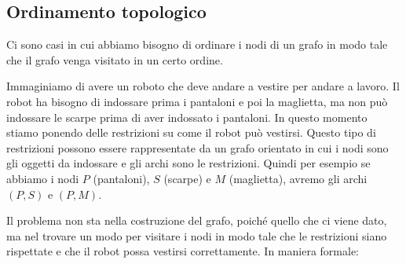 \documentclass[a4paper]{article}
\begin{document}
\subsection{Ordinamento topologico}

Ci sono casi in cui abbiamo bisogno di ordinare i nodi di un grafo in modo tale che 
il grafo venga visitato in un certo ordine. 
\ex{}
{
  Immaginiamo di avere un roboto che deve andare a vestire per andare a lavoro.
  Il robot ha bisogno di indossare prima i pantaloni e poi la maglietta, ma non può indossare le scarpe prima di aver indossato i pantaloni.
  In questo momento stiamo ponendo delle restrizioni su come il robot può vestirsi.
  Questo tipo di restrizioni possono essere rappresentate da un grafo orientato in cui i nodi sono gli oggetti da indossare e gli archi sono le restrizioni.
  Quindi per esempio se abbiamo i nodi $P$ (pantaloni), $S$ (scarpe) e $M$ (maglietta), avremo gli archi $(P, S)$ e $(P, M)$.
  \begin{figure}[H]
    \centering
  \end{figure}
}
\noindent
Il problema non sta nella costruzione del grafo, poiché quello che ci viene dato, 
ma nel trovare un modo per visitare i nodi in modo tale che le restrizioni siano rispettate e 
che il robot possa vestirsi correttamente. In maniera formale: 
\end{document}
